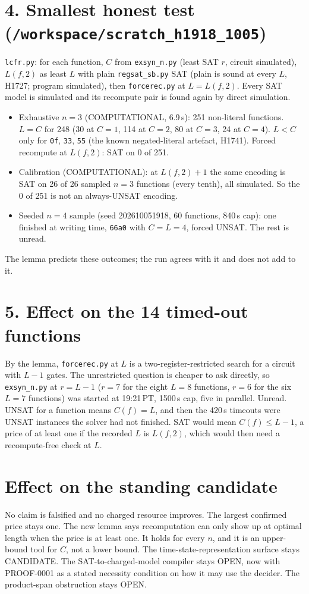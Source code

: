 \documentclass[11pt]{article}
\begin{document}
\section*{4. Smallest honest test (\texttt{/workspace/scratch\_h1918\_1005})}
\texttt{lcfr.py}: for each function, $C$ from \texttt{exsyn\_n.py} (least SAT $r$, circuit simulated), $L(f,2)$ as least $L$ with plain \texttt{regsat\_sb.py} SAT (plain is sound at every $L$, H1727; program simulated), then \texttt{forcerec.py} at $L=L(f,2)$. Every SAT model is simulated and its recompute pair is found again by direct simulation.
\begin{itemize}
\item Exhaustive $n=3$ (COMPUTATIONAL, 6.9\,s): 251 non-literal functions. $L=C$ for 248 (30 at $C=1$, 114 at $C=2$, 80 at $C=3$, 24 at $C=4$). $L<C$ only for \texttt{0f}, \texttt{33}, \texttt{55} (the known negated-literal artefact, H1741). Forced recompute at $L(f,2)$: SAT on 0 of 251.
\item Calibration (COMPUTATIONAL): at $L(f,2)+1$ the same encoding is SAT on 26 of 26 sampled $n=3$ functions (every tenth), all simulated. So the 0 of 251 is not an always-UNSAT encoding.
\item Seeded $n=4$ sample (seed 202610051918, 60 functions, 840\,s cap): one finished at writing time, \texttt{66a0} with $C=L=4$, forced UNSAT. The rest is unread.
\end{itemize}
The lemma predicts these outcomes; the run agrees with it and does not add to it.

\section*{5. Effect on the 14 timed-out functions}
By the lemma, \texttt{forcerec.py} at $L$ is a two-register-restricted search for a circuit with $L-1$ gates. The unrestricted question is cheaper to ask directly, so \texttt{exsyn\_n.py} at $r=L-1$ ($r=7$ for the eight $L=8$ functions, $r=6$ for the six $L=7$ functions) was started at 19:21\,PT, 1500\,s cap, five in parallel. Unread. UNSAT for a function means $C(f)=L$, and then the 420\,s timeouts were UNSAT instances the solver had not finished. SAT would mean $C(f)\le L-1$, a price of at least one if the recorded $L$ is $L(f,2)$, which would then need a recompute-free check at $L$.

\section*{Effect on the standing candidate}
No claim is falsified and no charged resource improves. The largest confirmed price stays one. The new lemma says recomputation can only show up at optimal length when the price is at least one. It holds for every $n$, and it is an upper-bound tool for $C$, not a lower bound. The time-state-representation surface stays CANDIDATE. The SAT-to-charged-model compiler stays OPEN, now with PROOF-0001 as a stated necessity condition on how it may use the decider. The product-span obstruction stays OPEN.
\end{document}
